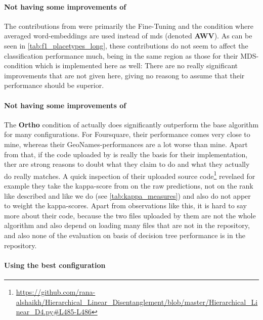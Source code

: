\paragraph{Not having some improvements of \cite{Ager2018}}
The contributions from \cite{Ager2018} were primarily the Fine-Tuning and the condition where averaged word-embeddings are used instead of \gls{mds} (denoted \textbf{AWV}). As can be seen in \autoref{tab:f1_placetypes_long}, these contributions do not seem to affect the classification performance much, being in the same region as those for their MDS-condition which is implemented here as well: There are no really significant improvements that are not given here, giving no reasong to assume that their performance should be superior.  

\paragraph{Not having some improvements of \cite{Alshaikh2020}}

The \textbf{Ortho} condition of \cite{Alshaikh2020} actually does significantly outperform the base algorithm for many configurations. For Foursquare, their performance comes very close to mine, whereas their GeoNames-performances are a lot worse than mine. Apart from that, if the code uploaded by \cite{Alshaikh2020} is really the basis for their implementation, ther are strong reasons to doubt what they claim to do and what they actually do really matches. A quick inspection of their uploaded source code\footnote{\url{https://github.com/rana-alshaikh/Hierarchical_Linear_Disentanglement/blob/master/Hierarchical_Linear_D4.py\#L485-L486}} revelaed for example they take the kappa-score from on the raw predictions, not on the rank like \cite{Derrac2015} described and like we do (see \autoref{tab:kappa_measures}) and also do not apper to weight the kappa-scores. Apart from observations like this, it is hard to say more about their code, because the two files uploaded by them are not the whole algorithm and also depend on loading many files that are not in the repository, and also none of the evaluation on basis of decision tree performance is in the repository.

\paragraph{Using the best configuration}

